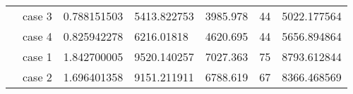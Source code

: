\begin{table}[]
\begin{tabular}{cllllll}
    \rowcolor[HTML]{FFFFC7} 
    \cellcolor[HTML]{FFFFC7}                                                                                               & case 3                  & 0.788151503                                                                            & 5413.822753                                                                               & 3985.978                                                                            & 44                                                                         & 5022.177564                                                                                \\ \cline{2-7} 
    \rowcolor[HTML]{FFFFC7} 
    \multirow{-4}{*}{\cellcolor[HTML]{FFFFC7}250}                                                                          & case 4                  & 0.825942278                                                                            & 6216.01818                                                                                & 4620.695                                                                            & 44                                                                         & 5656.894864                                                                                \\ \hline
    \rowcolor[HTML]{FFFFC7} 
    \cellcolor[HTML]{FFFFC7}                                                                                               & case 1                  & 1.842700005                                                                            & 9520.140257                                                                               & 7027.363                                                                            & 75                                                                         & 8793.612844                                                                                \\ \cline{2-7} 
    \rowcolor[HTML]{FFFFC7} 
    \cellcolor[HTML]{FFFFC7}                                                                                               & case 2                  & 1.696401358                                                                            & 9151.211911                                                                               & 6788.619                                                                            & 67                                                                         & 8366.468569                                                                                \\ \cline{2-7} 

\end{tabular}
\end{table}

